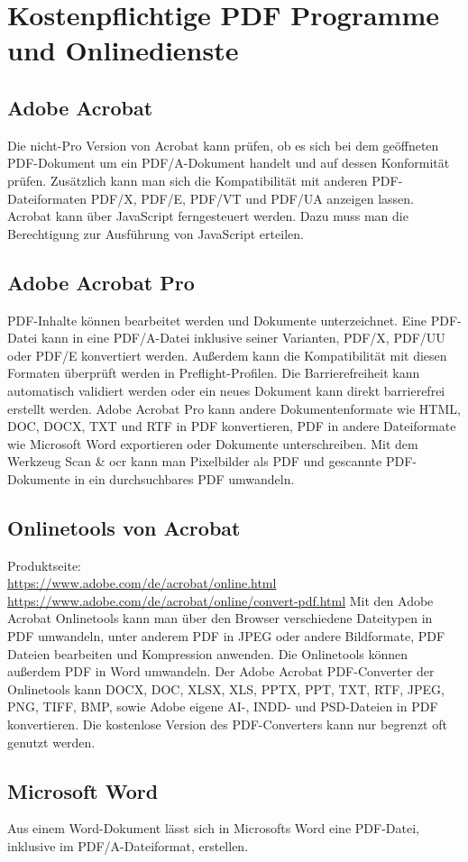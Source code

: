 \section{Kostenpflichtige PDF Programme und Onlinedienste}

\subsection{Adobe Acrobat}
Die nicht-Pro Version von Acrobat kann prüfen, ob es sich bei dem geöffneten PDF-Dokument um ein PDF/A-Dokument handelt und auf dessen Konformität prüfen. Zusätzlich kann man sich die Kompatibilität mit anderen PDF-Dateiformaten PDF/X, PDF/E, PDF/VT und PDF/UA anzeigen lassen. \cite{adobe-pdf-a} Acrobat kann über JavaScript ferngesteuert werden. Dazu muss man die Berechtigung zur Ausführung von JavaScript erteilen. \cite{schneeberger}

\subsection{Adobe Acrobat Pro}
PDF-Inhalte können bearbeitet werden und Dokumente unterzeichnet. \cite{adobe-search}
Eine PDF-Datei kann in eine PDF/A-Datei inklusive seiner Varianten, PDF/X, PDF/UU oder PDF/E konvertiert werden. Außerdem kann die Kompatibilität mit diesen Formaten überprüft werden in Preflight-Profilen. \cite{adobe-pdf-a} Die Barrierefreiheit kann automatisch validiert werden oder ein neues Dokument kann direkt barrierefrei erstellt werden.
Adobe Acrobat Pro kann andere Dokumentenformate wie HTML, DOC, DOCX, TXT und RTF in PDF konvertieren, PDF in andere Dateiformate wie Microsoft Word exportieren oder Dokumente unterschreiben. \cite{adobe-formate} 
Mit dem Werkzeug Scan \& \gls{ocr} kann man Pixelbilder als PDF und gescannte PDF-Dokumente in ein durchsuchbares PDF umwandeln. \cite{adobe-search}

\subsection{Onlinetools von Acrobat}
Produktseite: \\
\url{https://www.adobe.com/de/acrobat/online.html} \\
\url{https://www.adobe.com/de/acrobat/online/convert-pdf.html}
Mit den Adobe Acrobat Onlinetools kann man über den Browser verschiedene Dateitypen in PDF umwandeln, unter anderem PDF in JPEG oder andere Bildformate, PDF Dateien bearbeiten und Kompression anwenden. Die Onlinetools können außerdem PDF in Word umwandeln. \cite{adobe-search}
Der Adobe Acrobat PDF-Converter der Onlinetools kann DOCX, DOC, XLSX, XLS, PPTX, PPT, TXT, RTF, JPEG, PNG, TIFF, BMP, sowie Adobe eigene AI-, INDD- und PSD-Dateien in PDF konvertieren. \cite{adobe-formate} Die kostenlose Version des PDF-Converters kann nur begrenzt oft genutzt werden.

\subsection{Microsoft Word}
Aus einem Word-Dokument lässt sich in Microsofts Word eine PDF-Datei, inklusive im PDF/A-Dateiformat, erstellen. \cite{adobe-pdf-a}

